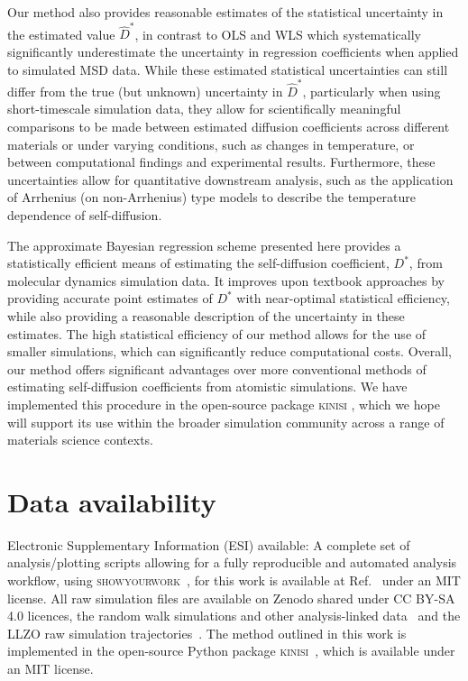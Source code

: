 \documentclass[reprint,superscriptaddress,nobibnotes,amsmath,amssymb,aps,prx,hidelinks]{revtex4-2}
\newcommand{\Dest}{\ensuremath{\widehat{D}^*}}
\newcommand{\D}{\ensuremath{D^*}}
\begin{document}
Our method also provides reasonable estimates of the statistical uncertainty in the estimated value $\Dest$, in contrast to OLS and WLS which systematically significantly underestimate the uncertainty in regression coefficients when applied to simulated MSD data. 
While these estimated statistical uncertainties can still differ from the true (but unknown) uncertainty in $\Dest$, particularly when using short-timescale simulation data, they allow for scientifically meaningful comparisons to be made between estimated diffusion coefficients across different materials or under varying conditions, such as changes in temperature, or between computational findings and experimental results.
Furthermore, these uncertainties allow for quantitative downstream analysis, such as the application of Arrhenius (on non-Arrhenius) type models to describe the temperature dependence of self-diffusion.

The approximate Bayesian regression scheme presented here provides a statistically efficient means of estimating the self-diffusion coefficient, $\D$, from molecular dynamics simulation data.
It improves upon textbook approaches by providing accurate point estimates of $\D$ with near-optimal statistical efficiency, while also providing a reasonable description of the uncertainty in these estimates.
The high statistical efficiency of our method allows for the use of smaller simulations, which can significantly reduce computational costs.
Overall, our method offers significant advantages over more conventional methods of estimating self-diffusion coefficients from atomistic simulations.
We have implemented this procedure in the open-source package \textsc{kinisi} \cite{mccluskey_kinisi_2022}, which we hope will support its use within the broader simulation community across a range of materials science contexts.
\section*{Data availability}

Electronic Supplementary Information (ESI) available: A complete set of analysis/plotting scripts allowing for a fully reproducible and automated analysis workflow, using \textsc{showyourwork}~\cite{luger_showyourwork_2021}, for this work is available at Ref.~\cite{mccluskey_github_2022} under an MIT license.
All raw simulation files are available on Zenodo shared under CC BY-SA 4.0 licences, the random walk simulations and other analysis-linked data~\cite{mccluskey_zenodo_2022} and the LLZO raw simulation trajectories~\cite{coles_llzo_zenodo_2022}.
The method outlined in this work is implemented in the open-source Python package \textsc{kinisi}~\cite{mccluskey_kinisi_2022}, which is available under an MIT license.
\end{document}
